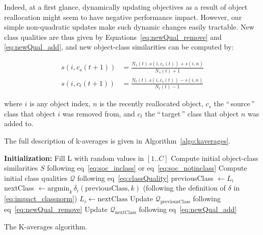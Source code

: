 \documentclass[natbib,smallextended]{svjour3}
\newcommand{\gl}[1]{``\,#1\,''} %
\begin{document}
Indeed, at a first glance, dynamically updating objectives as a result of object reallocation might seem to have negative performance impact. However, our simple non-quadratic updates make such dynamic changes easily tractable. New class qualities are thus given by Equations~\ref{eq:newQual_remove} and \ref{eq:newQual_add}, and new object-class similarities can be computed by:


\begin{equation}
	\begin{aligned}
    s(i, c_s(t+1)) &= \frac{N_s(t).s(i, c_s(t)) + s(i,n)}{N_s(t)+1} \\
    s(i, c_t(t+1)) &= \frac{N_t(t).s(i, c_s(t)) - s(i,n)}{N_t(t)-1}
   	\end{aligned}
  \label{eq:newSimilNewC}
\end{equation}

\noindent where $i$ is any object index, $n$ is the recently reallocated object, $c_s$ the \gl{source} class that object $i$ was removed from, and $c_t$ the \gl{target} class that object $n$ was added to.

The full description of k-averages is given in Algorithm~\ref{algo:kaverages}.

\begin{algorithm}
	\label{algo:kaverages}
	\SetAlgoLined
	\BlankLine
	\textbf{Initialization:}
		Fill L with random values in $[1..C]$\;
		Compute initial object-class similarities $S$ following eq~\ref{eq:soc_inclass} or eq~\ref{eq:soc_notinclass}\;
		Compute initial class qualities $\mathcal{Q}$ following eq~\ref{eq:classQuality}\;
	\BlankLine
	 {
		 {
			previousClass $\leftarrow L_i$\;
			nextClass $\leftarrow \mathrm{argmin}_k\,\delta_i(\mathrm{previousClass}, k)$ \label{algline:kaverages_search}
			(following the definition of $\delta$ in  \ref{eq:impact_classnorm})\; %
			 {
				$L_i \leftarrow \mathrm{nextClass}$\;
				Update $\mathcal{Q}_\mathrm{previousClass}$ following eq~\ref{eq:newQual_remove}\;
				Update $\mathcal{Q}_\mathrm{nextClass}$ following eq~\ref{eq:newQual_add}\;
			}
		}
	}
	\BlankLine
	\caption{The K-averages algorithm.}
\end{algorithm}
\end{document}
